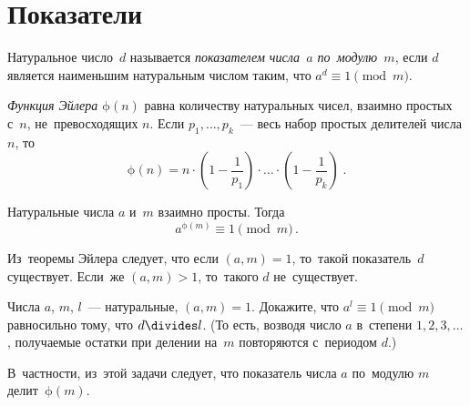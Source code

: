
\section*{Показатели}


Натуральное число~$d$ называется \emph{показателем числа~$a$ по~модулю~$m$},
если $d$ является наименьшим натуральным числом таким, что
$a^d \equiv 1 \pmod{m}$.

\emph{Функция Эйлера} $\mathrm{\phi}(n)$ равна количеству натуральных чисел,
взаимно простых с~$n$, не~превосходящих $n$.
Если $p_1, \ldots, p_k$~— весь набор простых делителей числа $n$,
то
\[
    \mathrm{\phi}(n)
=
    n
    \cdot
    \left( 1 - \frac{1}{p_1} \right)
    \cdot \ldots \cdot
    \left( 1 - \frac{1}{p_k} \right)
\; . \]

Натуральные числа $a$ и~$m$ взаимно просты.
Тогда
\[
    a^{\mathrm{\phi}(m)} \equiv 1 \pmod{m}
\, . \]

Из~теоремы Эйлера следует, что если $(a, m) = 1$, то~такой показатель~$d$
существует.
Если~же $(a, m) > 1$, то~такого $d$ не~существует.

\begin{problems}

\item
Числа $a$, $m$, $l$~— натуральные, $(a, m) = 1$.
Докажите, что $a^l \equiv 1 \pmod{m}$ равносильно тому, что $d \divides l$.
(То есть, возводя число $a$ в~степени $1, 2, 3, \ldots$, получаемые остатки при
делении на~$m$ повторяются с~периодом $d$.)

\end{problems}

В~частности, из~этой задачи следует, что показатель числа $a$ по~модулю $m$
делит~$\mathrm{\phi}(m)$.

